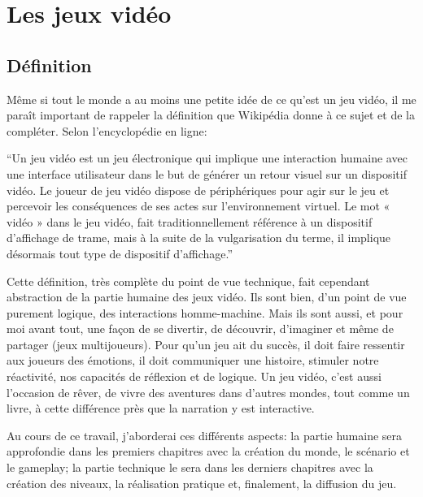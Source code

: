 \section{Les jeux vidéo}
\subsection{Définition}
Même si tout le monde a au moins une petite idée de ce qu'est un jeu vidéo, il me paraît important de rappeler la définition que Wikipédia donne à ce sujet et de la compléter. Selon l'encyclopédie en ligne:

\begin{displayquote}
\enquote{Un jeu vidéo est un jeu électronique qui implique une interaction humaine avec une interface utilisateur dans le but de générer un retour visuel sur un dispositif vidéo. Le joueur de jeu vidéo dispose de périphériques pour agir sur le jeu et percevoir les conséquences de ses actes sur l'environnement virtuel. Le mot « vidéo » dans le jeu vidéo, fait traditionnellement référence à un dispositif d'affichage de trame, mais à la suite de la vulgarisation du terme, il implique désormais tout type de dispositif d'affichage.}\cite{Jeuvideo_}
\end{displayquote}

Cette définition, très complète du point de vue technique, fait cependant abstraction de la partie humaine des jeux vidéo. Ils sont bien, d'un point de vue purement logique, des interactions homme-machine. Mais ils sont aussi, et pour moi avant tout, une façon de se divertir, de découvrir, d'imaginer et même de partager (jeux multijoueurs). Pour qu'un jeu ait du succès, il doit faire ressentir aux joueurs des émotions, il doit communiquer une histoire, stimuler notre réactivité, nos capacités de réflexion et de logique. Un jeu vidéo, c'est aussi l'occasion de rêver, de vivre des aventures dans d'autres mondes, tout comme un livre, à cette différence près que la narration y est interactive.

Au cours de ce travail, j'aborderai ces différents aspects: la partie humaine sera approfondie dans les premiers chapitres avec la création du monde, le scénario et le gameplay; la partie technique le sera dans les derniers chapitres avec la création des niveaux, la réalisation pratique et, finalement, la diffusion du jeu.


